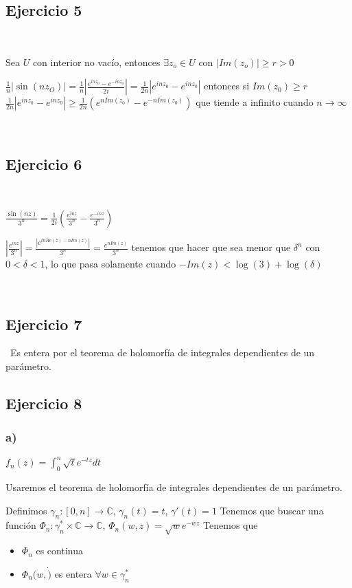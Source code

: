 
\subsection{Ejercicio 5}

\

Sea $U$ con interior no vacío, entonces $\exists z_o\in U$ con $|Im(z_o)| \geq r > 0$

$\frac{1}{n}|\sin(nz_O)| = \frac{1}{n}\left| \frac{e^{inz_0}-e^{-inz_0}}{2i} \right|= \frac{1}{2n} \left| e^{inz_0} - e^{inz_0} \right| $
entonces si $Im(z_0)\geq r$
$\frac{1}{2n} \left| e^{inz_0} - e^{inz_0} \right|  \geq \frac{1}{2n} \left( e^{nIm(z_0)} -e^{-nIm(z_0)} \right)  $
que tiende a infinito cuando $n\rightarrow\infty$

\

\subsection{Ejercicio 6}

\

$\frac{\sin(nz)}{3^n} = \frac{1}{2i} \left( \frac{e^{inz}}{3^n} - \frac{e^{-inz}}{3^n} \right)$

$\left| \frac{e^{inz}}{3^n} \right| = \frac{|e^{inRe(z)-nIm(z)}|}{3^n} = \frac{e^{nIm(z)}}{3^n}$
tenemos que hacer que sea menor que $\delta^n$ con $0<\delta<1$, lo que pasa solamente cuando $-Im(z) < \log(3)+\log(\delta)$

\

\subsection{Ejercicio 7}

\
Es entera por el teorema de holomorfía de integrales dependientes de un parámetro.



\subsection{Ejercicio 8}

\subsubsection{a)}
$f_n(z) = \int_0^n \sqrt{t}e^{-tz}dt$

Usaremos el teorema de holomorfía de integrales dependientes de un parámetro.

Definimos
$\gamma_n :[0,n] \rightarrow \mathbb{C}$, $\gamma_n(t)=t$, $\gamma'(t) = 1$
Tenemos que buscar una función $\Phi_n : \gamma_n^{\ast}\times\mathbb{C} \rightarrow \mathbb{C}$, $\Phi_n(w,z) = \sqrt{w}e^{-wz}$
Tenemos que
\begin{itemize}
	\item $\Phi_n$ es continua
	\item $\Phi_n(w,\dot)$ es entera $\forall w\in\gamma_n^{\ast}$
\end{itemize}

